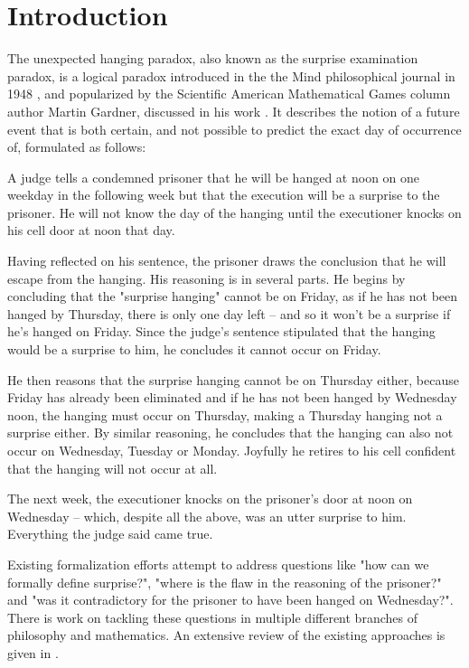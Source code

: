 \documentclass[runningheads]{llncs}
\newenvironment{myindent}{\begin{adjustwidth}{1cm}{}}{\end{adjustwidth}}
\begin{document}
\section{Introduction}

The unexpected hanging paradox, also known as the surprise examination paradox,
is a logical paradox introduced in the the Mind philosophical journal in 1948 \cite{original},
and popularized by the Scientific American Mathematical
Games column author Martin Gardner, discussed in his work \cite{diversions}.
It describes the notion of a future event that
is both certain, and not possible to predict the exact day of occurrence of,
formulated as follows: \newline

\begin{myindent}
  A judge tells a condemned prisoner that he will be hanged at noon on one weekday
  in the following week but that the execution will be a surprise to the prisoner.
  He will not know the day of the hanging until the executioner knocks on his cell door at noon that day.

  Having reflected on his sentence, the prisoner draws the conclusion that he will
  escape from the hanging. His reasoning is in several parts. He begins by concluding
  that the "surprise hanging" cannot be on Friday, as if he has not been hanged by
  Thursday, there is only one day left – and so it won't be a surprise if he's hanged on
  Friday. Since the judge's sentence stipulated that the hanging would be a surprise
  to him, he concludes it cannot occur on Friday.

  He then reasons that the surprise hanging cannot be on Thursday either, because
  Friday has already been eliminated and if he has not been hanged by Wednesday noon,
  the hanging must occur on Thursday, making a Thursday hanging not a surprise either.
  By similar reasoning, he concludes that the hanging can also not occur on Wednesday,
  Tuesday or Monday. Joyfully he retires to his cell confident that the hanging will
  not occur at all.

  The next week, the executioner knocks on the prisoner's door at noon on Wednesday –
  which, despite all the above, was an utter surprise to him. Everything the judge said came true. \newline
\end{myindent}

 Existing formalization efforts attempt to address questions like "how can we formally
define surprise?", "where is the flaw in the
reasoning of the prisoner?" and "was it contradictory for the prisoner to have been
hanged on Wednesday?". There is work on tackling these questions in multiple
different branches of philosophy and mathematics.
An extensive review of the existing approaches is given in \cite{extensivereview}.
\end{document}
